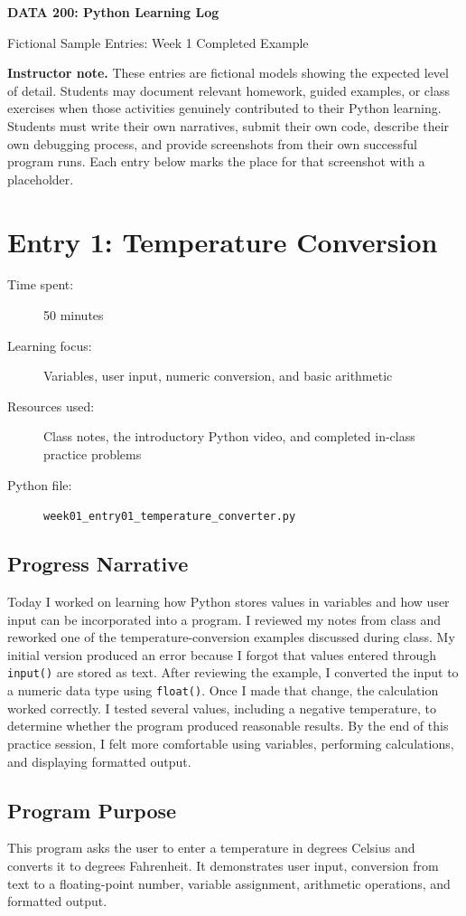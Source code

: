 \documentclass[12pt]{article}
\newcommand{\entrydetails}[4]{%
\begin{description}
  \item[Time spent:] #1
  \item[Learning focus:] #2
  \item[Resources used:] #3
  \item[Python file:] \texttt{#4}
\end{description}}
\begin{document}
\begin{center}
{\LARGE\bfseries DATA 200: Python Learning Log}\par
\vspace{0.5em}
{\large Fictional Sample Entries: Week 1 Completed Example}\par
\end{center}

\textbf{Instructor note.} These entries are fictional models showing the expected level of detail. Students may document relevant homework, guided examples, or class exercises when those activities genuinely contributed to their Python learning. Students must write their own narratives, submit their own code, describe their own debugging process, and provide screenshots from their own successful program runs. Each entry below marks the place for that screenshot with a placeholder.

\section{Entry 1: Temperature Conversion}

\entrydetails
  {50 minutes}
  {Variables, user input, numeric conversion, and basic arithmetic}
  {Class notes, the introductory Python video, and completed in-class practice problems}
  {week01\_entry01\_temperature\_converter.py}

\subsection*{Progress Narrative}
Today I worked on learning how Python stores values in variables and how user input can be incorporated into a program. I reviewed my notes from class and reworked one of the temperature-conversion examples discussed during class. My initial version produced an error because I forgot that values entered through \texttt{input()} are stored as text. After reviewing the example, I converted the input to a numeric data type using \texttt{float()}. Once I made that change, the calculation worked correctly. I tested several values, including a negative temperature, to determine whether the program produced reasonable results. By the end of this practice session, I felt more comfortable using variables, performing calculations, and displaying formatted output.

\subsection*{Program Purpose}
This program asks the user to enter a temperature in degrees Celsius and converts it to degrees Fahrenheit. It demonstrates user input, conversion from text to a floating-point number, variable assignment, arithmetic operations, and formatted output.
\end{document}
